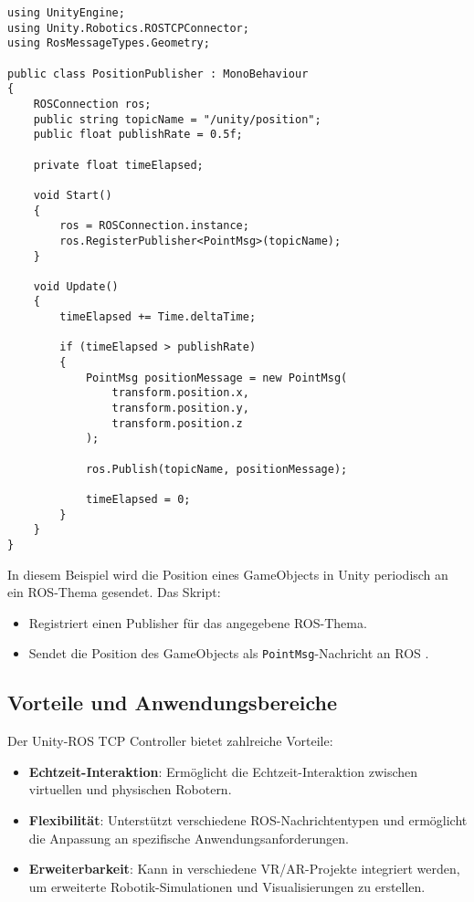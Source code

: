 \begin{verbatim}
using UnityEngine;
using Unity.Robotics.ROSTCPConnector;
using RosMessageTypes.Geometry;

public class PositionPublisher : MonoBehaviour
{
    ROSConnection ros;
    public string topicName = "/unity/position";
    public float publishRate = 0.5f;

    private float timeElapsed;

    void Start()
    {
        ros = ROSConnection.instance;
        ros.RegisterPublisher<PointMsg>(topicName);
    }

    void Update()
    {
        timeElapsed += Time.deltaTime;

        if (timeElapsed > publishRate)
        {
            PointMsg positionMessage = new PointMsg(
                transform.position.x,
                transform.position.y,
                transform.position.z
            );

            ros.Publish(topicName, positionMessage);

            timeElapsed = 0;
        }
    }
}
\end{verbatim}

In diesem Beispiel wird die Position eines GameObjects in Unity periodisch an ein ROS-Thema gesendet. Das Skript:

\begin{itemize}
    \item Registriert einen Publisher für das angegebene ROS-Thema.
    \item Sendet die Position des GameObjects als \texttt{PointMsg}-Nachricht an ROS \cite{unity_ros_tcp_connector}.
\end{itemize}

\subsection{Vorteile und Anwendungsbereiche}

Der Unity-ROS TCP Controller bietet zahlreiche Vorteile:

\begin{itemize}
    \item \textbf{Echtzeit-Interaktion}: Ermöglicht die Echtzeit-Interaktion zwischen virtuellen und physischen Robotern.
    \item \textbf{Flexibilität}: Unterstützt verschiedene ROS-Nachrichtentypen und ermöglicht die Anpassung an spezifische Anwendungsanforderungen.
    \item \textbf{Erweiterbarkeit}: Kann in verschiedene VR/AR-Projekte integriert werden, um erweiterte Robotik-Simulationen und Visualisierungen zu erstellen.
\end{itemize}

